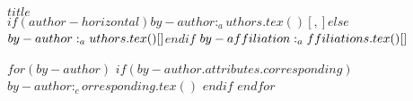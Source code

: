 \begin{flushleft}

\Large{
  \textbf{$title$}
}
\newline
\\

$if(author-horizontal)$$by-author:_authors.tex()[, ]$$else$$by-author:_authors.tex()[\newline ]$$endif$
\newline
\newline
$by-affiliation:_affiliations.tex()[\newline ]$
\bigskip

$for(by-author)$
$if(by-author.attributes.corresponding)$
$by-author:_corresponding.tex()$
$endif$
$endfor$

\end{flushleft}

\pagebreak
